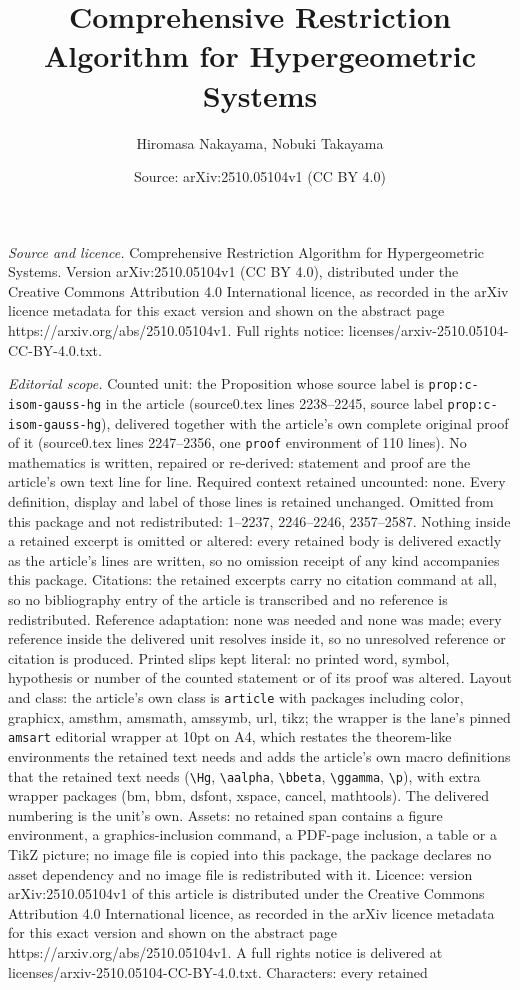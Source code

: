 \documentclass[10pt,a4paper]{amsart}
\title[Comprehensive Restriction Algorithm for Hypergeometric Syste]{Comprehensive Restriction Algorithm for Hypergeometric Systems}
\author{Hiromasa Nakayama, Nobuki Takayama}
\date{Source: arXiv:2510.05104v1 (CC BY 4.0)}
\begin{document}
\maketitle

\noindent\emph{Source and licence.} Comprehensive Restriction Algorithm for Hypergeometric Systems. Version arXiv:2510.05104v1 (CC BY 4.0), distributed under the Creative Commons Attribution 4.0 International licence, as recorded in the arXiv licence metadata for this exact version and shown on the abstract page https://arxiv.org/abs/2510.05104v1. Full rights notice: licenses/arxiv-2510.05104-CC-BY-4.0.txt.\par\smallskip

\noindent\textit{Editorial scope.} Counted unit: the Proposition whose source label is \texttt{prop:c-isom-gauss-hg} in the article (source0.tex lines 2238--2245, source label \texttt{prop:c-isom-gauss-hg}), delivered together with the article's own complete original proof of it (source0.tex lines 2247--2356, one \texttt{proof} environment of 110 lines). No mathematics is written, repaired or re-derived: statement and proof are the article's own text line for line. Required context retained uncounted: none. Every definition, display and label of those lines is retained unchanged. Omitted from this package and not redistributed: 1--2237, 2246--2246, 2357--2587. Nothing inside a retained excerpt is omitted or altered: every retained body is delivered exactly as the article's lines are written, so no omission receipt of any kind accompanies this package. Citations: the retained excerpts carry no citation command at all, so no bibliography entry of the article is transcribed and no reference is redistributed. Reference adaptation: none was needed and none was made; every reference inside the delivered unit resolves inside it, so no unresolved reference or citation is produced. Printed slips kept literal: no printed word, symbol, hypothesis or number of the counted statement or of its proof was altered. Layout and class: the article's own class is \texttt{article} with packages including color, graphicx, amsthm, amsmath, amssymb, url, tikz; the wrapper is the lane's pinned \texttt{amsart} editorial wrapper at 10pt on A4, which restates the theorem-like environments the retained text needs and adds the article's own macro definitions that the retained text needs (\texttt{\textbackslash Hg}, \texttt{\textbackslash aalpha}, \texttt{\textbackslash bbeta}, \texttt{\textbackslash ggamma}, \texttt{\textbackslash p}), with extra wrapper packages (bm, bbm, dsfont, xspace, cancel, mathtools). The delivered numbering is the unit's own. Assets: no retained span contains a figure environment, a graphics-inclusion command, a PDF-page inclusion, a table or a TikZ picture; no image file is copied into this package, the package declares no asset dependency and no image file is redistributed with it. Licence: version arXiv:2510.05104v1 of this article is distributed under the Creative Commons Attribution 4.0 International licence, as recorded in the arXiv licence metadata for this exact version and shown on the abstract page https://arxiv.org/abs/2510.05104v1. A full rights notice is delivered at licenses/arxiv-2510.05104-CC-BY-4.0.txt. Characters: every retained 
\end{document}
